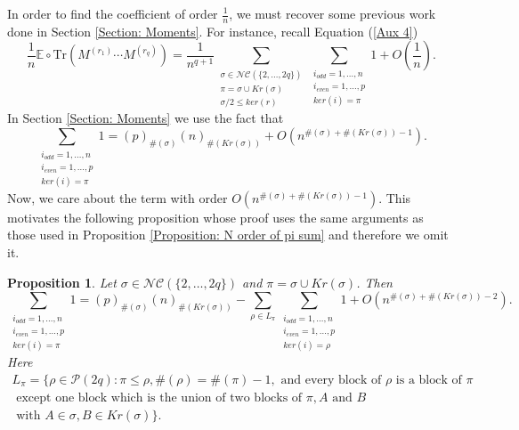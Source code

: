 \documentclass{article}
\newtheorem{proposition}[theorem]{Proposition}
\theoremstyle{definition}
\newcommand{\E}{\mathbb{E}}
\newcommand{\cP}{\mathcal{P}}
\newcommand{\NC}{\mathcal{NC}}
\newcommand{\Tr}{\text{Tr}}
\begin{document}
{In order to find the coefficient of order $\frac{1}{n}$, we must recover some previous work done in Section \ref{Section: Moments}. For instance, recall Equation (\ref{Aux 4})
\begin{equation*}
\frac{1}{n}\E\circ \Tr(M^{(r_1)}\cdots M^{(r_q)})=\frac{1}{n^{q+1}}\sum_{\substack{\sigma\in \NC(\{2,\dots,2q\}) \\ \pi=\sigma\cup Kr(\sigma) \\ \sigma/2\leq ker(r)}}\sum_{\substack{i_{odd}=1,\dots,n \\ i_{even}=1,\dots,p \\ ker(i)=\pi}}1+O(\frac{1}{n}).
\end{equation*}
In Section \ref{Section: Moments} we use the fact that
$$\sum_{\substack{i_{odd}=1,\dots,n \\ i_{even}=1,\dots,p \\ ker(i)=\pi}}
1=(p)_{\#(\sigma)}(n)_{\#(Kr(\sigma))}+O(n^{\#(\sigma)+\#(Kr(\sigma))-1}).$$
Now, we care about the term with order $O(n^{\#(\sigma)+\#(Kr(\sigma))-1})$. This motivates the following proposition whose proof uses the same arguments as those used in Proposition \ref{Proposition: N order of pi sum} and therefore we omit it.

\begin{proposition}\label{Proposition: Order of sum when pi=q+1}
Let $\sigma\in \NC(\{2,\dots,2q\})$ and $\pi=\sigma\cup Kr(\sigma)$. Then
$$\sum_{\substack{i_{odd}=1,\dots,n \\ i_{even}=1,\dots,p \\ ker(i)=\pi}}1=(p)_{\#(\sigma)}(n)_{\#(Kr(\sigma))}-\sum_{\rho\in L_\pi}\sum_{\substack{i_{odd}=1,\dots,n \\ i_{even}=1,\dots,p \\ ker(i)=\rho}}1+O(n^{\#(\sigma)+\#(Kr(\sigma))-2}).$$
Here 
\begin{multline*}
L_\pi=\{\rho\in \cP(2q): \pi\leq\rho, \#(\rho)=\#(\pi)-1, \text{ and every block of }\rho\text{ is a block of }\pi \\\text{ except }\text{one block which is the union of two blocks of }\pi,A\text{ and }B \\
\text{ with } A\in \sigma,B\in Kr(\sigma)\}.
\end{multline*}
\end{proposition}

}
\end{document}
